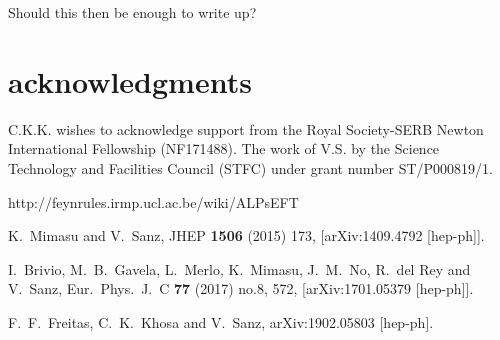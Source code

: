 \documentclass[aps,onecolumn,showpacs,superscriptaddress,groupedaddress,nofootinbib,preprint]{revtex4-1}
\begin{document}
Should this then be enough to write up?


\section{acknowledgments}
C.K.K. wishes to acknowledge support from the Royal Society-SERB Newton International Fellowship (NF171488). 
The work of V.S. by the Science Technology and Facilities Council (STFC) under grant number
ST/P000819/1.


\begin{thebibliography}{99}
http://feynrules.irmp.ucl.ac.be/wiki/ALPsEFT

  K.~Mimasu and V.~Sanz,
  JHEP {\bf 1506} (2015) 173,
  [arXiv:1409.4792 [hep-ph]].



  I.~Brivio, M.~B.~Gavela, L.~Merlo, K.~Mimasu, J.~M.~No, R.~del Rey and V.~Sanz,
  Eur.\ Phys.\ J.\ C {\bf 77} (2017) no.8,  572,
  [arXiv:1701.05379 [hep-ph]].


  F.~F.~Freitas, C.~K.~Khosa and V.~Sanz,
  arXiv:1902.05803 [hep-ph].

\end{thebibliography}
\end{document}
